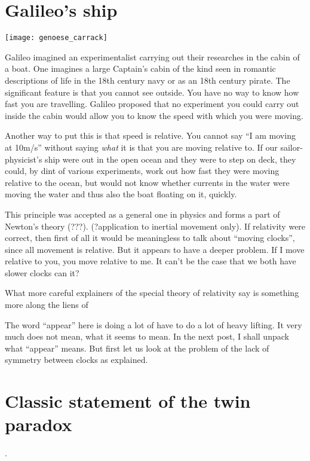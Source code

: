 \documentclass[a4paper]{report}
\begin{document}
\section*{Galileo's ship}
\texttt{[image: genoese\_carrack]}

Galileo imagined an experimentalist carrying out their researches in the cabin of a boat. One imagines a large Captain's cabin of the kind seen in romantic descriptions of life in the 18th century navy or as an 18th century pirate. The significant feature is that you cannot see outside. You have no way to know how fast you are travelling. Galileo proposed that no experiment you could carry out inside the cabin would allow you to know the speed with which you were moving.

Another way to put this is that speed is relative. You cannot say ``I am moving at 10m/s'' without saying {\em what} it is that you are moving relative to. If our sailor-physicist's ship were out in the open ocean and they were to step on deck, they could, by dint of various experiments, work out how fast they were moving relative to the ocean, but would not know whether currents in the water were moving the water and thus also the boat floating on it, quickly.

This principle was accepted as a general one in physics and forms a part of Newton's theory (???). (?application to inertial movement only). If relativity were correct, then first of all it would be meaningless to talk about ``moving clocks'', since all movement is relative. But it appears to have a deeper problem. If I move relative to you, you move relative to me. It can't be the case that we both have slower clocks can it?

What more careful explainers of the special theory of relativity say is something more along the liens of 


The word ``appear'' here is doing a lot of have to do a lot of heavy lifting. It very much does not mean, what it seems to mean. In the next post, I shall unpack what ``appear'' means. But first let us look at the problem of the lack of symmetry between clocks as explained.

\section*{Classic statement of the twin paradox}.
\end{document}
